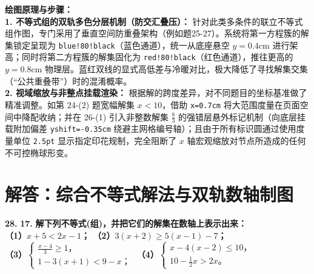 \vspace{0.4cm}
{\small\color{blue!70!black}
\textbf{绘图原理与步骤：}\\
\textbf{1. 不等式组的双轨多色分层机制（防交汇叠压）：} 针对此类多条件的联立不等式组作图，专门采用了垂直空间防重叠架构（例如题25-27）。系统将第一方程簇的解集锁定呈现为 \texttt{blue!80!black}（蓝色通道），统一从底座悬空 $y=0.4\mathrm{cm}$ 进行架高；同时将第二方程簇的解集固化为 \texttt{red!80!black}（红色通道），推往更高的 $y=0.8\mathrm{cm}$ 物理层。蓝红双线的显式高低差与冷暖对比，极大降低了寻找解集交集（“公共重叠带”）时的混淆概率。\\
\textbf{2. 视域缩放与非整点挂载渲染：} 根据解的跨度差异，对不同题目的坐标基准做了精准调整。如第 24-(2) 题宽幅解集 $x < 10$，借助 \texttt{x=0.7cm} 将大范围度量在页面空间中降配收纳；并在 26-(1) 引入非整数解集 $\frac{8}{3}$ 的强错层悬外标记机制（向底层挂载附加偏差 \texttt{yshift=-0.35cm} 绕避主网格编号轴）；且由于所有标识圆通过使用度量单位 \texttt{2.5pt} 显示指定印花规制，完全阻断了 $x$ 轴宏观缩放对节点所造成的任何不可控椭球形变。
}

\newpage



\section{解答：综合不等式解法与双轨数轴制图}

\vspace{0.6cm}

\textbf{\LARGE 28.} \textbf{\color{cyan!80!blue} 17. }\textbf{解下列不等式(组)，并把它们的解集在数轴上表示出来：\\
（1）$x+5 < 2x-1$； \hspace{2.5cm} （2）$3(x+2) \geqslant 5(x-1)-7$；\\[8pt]
（3）$\begin{cases} \frac{x-4}{3} \geqslant 1\text{，} \\ 1-3(x+1) < 9-x\text{；} \end{cases}$ \hspace{1cm} （4）$\begin{cases} x-4(x-2) \leqslant 10\text{，} \\ 10-\frac{1}{2}x > 2x\text{。} \end{cases}$}

